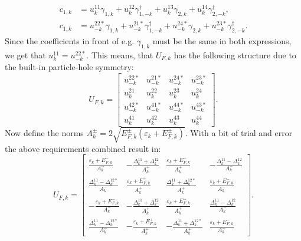 \begin{align}
c_{1,k} &= u^{11}_k \gamma_{1,k} + u^{12}_k \gamma^\dagger_{1,-k} + u^{13}_k \gamma_{2,k} + u^{14}_k \gamma^\dagger_{2,-k}, \nonumber \\
c_{1,k} &= u^{22*}_{-k} \gamma_{1,k} + u^{21*}_{-k} \gamma^\dagger_{1,-k} + u^{24*}_{-k} \gamma_{2,k} + u^{23*}_{-k} \gamma^\dagger_{2,-k}. \nonumber
\end{align}
Since the coefficients in front of e.g. $\gamma_{1,k}$ must be the same in both expressions, we get that $u^{11}_k = u^{22*}_{-k}$. This means, that $U_{F,k}$ has the following structure due to the built-in particle-hole symmetry:
\begin{equation}
U_{F,k} = \begin{bmatrix} 
u^{22*}_{-k} & u^{21*}_{-k} & u^{24*}_{-k} & u^{23*}_{-k}           \\  
u^{21}_k 	 & u^{22}_k 	& u^{23}_k 	   & u^{24}_k               \\ 
u^{42*}_{-k} & u^{41*}_{-k} & u^{44*}_{-k} & u^{43*}_{-k}           \\ 
u^{41}_k 	 & u^{42}_k 	& u^{43}_k 	   & u^{44}_k
\end{bmatrix}. \nonumber
\end{equation}
Now define the norms $A^{\pm}_k = 2 \sqrt{ E^{\pm}_{F,k}(\varepsilon_k + E^{\pm}_{F,k}) }$. With a bit of trial and error the above requirements combined result in:
\begin{equation}
U_{F,k} = \begin{bmatrix} 
\frac{\varepsilon_k + E^{-}_{F,k}}{A^{-}_k}    & -\frac{\Delta^{11}_k + \Delta^{12}_k}{A^{+}_k} & \frac{\varepsilon_k + E^{+}_{F,k}}{A^{+}_k}     & -\frac{\Delta^{11}_k - \Delta^{12}_k}{A^{-}_k}  \\  
\frac{\Delta^{11}_k - \Delta^{12*}_k}{A^{-}_k} & \frac{\varepsilon_k + E^{+}_{F,k}}{A^{+}_k}    & \frac{\Delta^{11}_k + \Delta^{12*}_k}{A^{+}_k}  & \frac{\varepsilon_k + E^{-}_{F,k}}{A^{-}_k}     \\ 
-\frac{\varepsilon_k + E^{-}_{F,k}}{A^{-}_k}   & -\frac{\Delta^{11}_k + \Delta^{12}_k}{A^{+}_k} & \frac{\varepsilon_k + E^{+}_{F,k}}{A^{+}_k}     & \frac{\Delta^{11}_k - \Delta^{12}_k}{A^{-}_k} \\ 
\frac{\Delta^{11}_k - \Delta^{12*}_k}{A^{-}_k} & -\frac{\varepsilon_k + E^{+}_{F,k}}{A^{+}_k}   & -\frac{\Delta^{11}_k + \Delta^{12*}_k}{A^{+}_k} & \frac{\varepsilon_k + E^{-}_{F,k}}{A^{-}_k} 
\end{bmatrix}. \nonumber
\end{equation}
